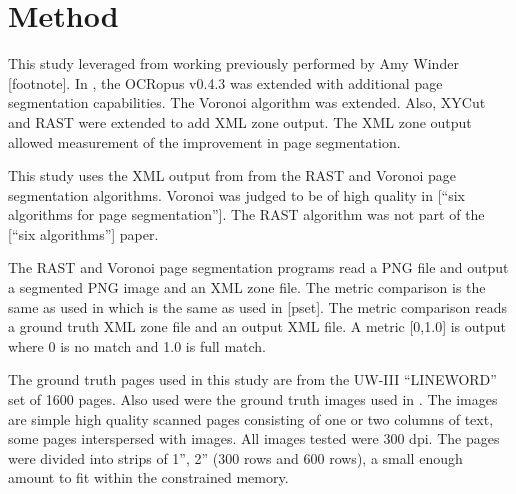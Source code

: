 \documentclass[conference]{IEEEtran}
\begin{document}
%
%
\section{Method}
This study leveraged from working previously performed by Amy Winder
[footnote]. In \cite{IEEEhowto:Winder}, the OCRopus v0.4.3 was extended with additional page
segmentation capabilities. The Voronoi algorithm was extended. Also, XYCut and
RAST were extended to add XML zone output. The XML zone output allowed 
measurement of the improvement in page segmentation.

This study uses the XML output from \cite{IEEEhowto:Winder} from the RAST and Voronoi page
segmentation algorithms. Voronoi was judged to be of high quality in [“six
algorithms for page segmentation”]. The RAST algorithm was not part of the
[“six algorithms”] paper. 

The RAST and Voronoi page segmentation programs read a PNG file and output a
segmented PNG image and an XML zone file. The metric comparison is the same as
used in \cite{IEEEhowto:Winder} which is the same as used in [pset]. The metric comparison
reads a ground truth XML zone file and an output XML file. A metric [0,1.0] is
output where 0 is no match and 1.0 is full match. 

The ground truth pages used in this study are from the UW-III “LINEWORD” set of
1600 pages. Also used were the ground truth images used in \cite{IEEEhowto:Winder}. The
\cite{IEEEhowto:Winder} images are simple high quality scanned pages consisting of one or two
columns of text, some pages interspersed with images. All images tested were
300 dpi.  The pages were divided into strips of 1”, 2” (300 rows and 600 rows),
a small enough amount to fit within the constrained memory. 

\end{document}
